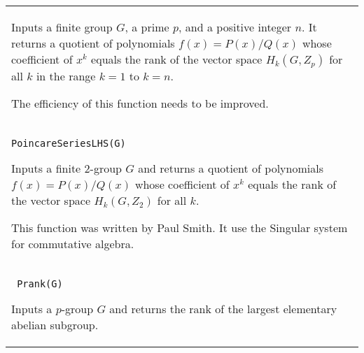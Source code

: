 \documentclass[a4paper,11pt]{report}
\begin{document}
{\begin{center}
\begin{tabular}{|l|}
 Inputs a finite group $G$, a prime $p$, and a positive integer $n$. It returns a quotient of polynomials $f(x)=P(x)/Q(x)$ whose coefficient of $x^k$ equals the rank of the vector space $H_k(G,Z_p)$ for all $k$ in the range $k=1$ to $k=n$. 

 The efficiency of this function needs to be improved. \\
 \texttt{PoincareSeriesLHS(G) } 

 Inputs a finite $2$-group $G$ and returns a quotient of polynomials $f(x)=P(x)/Q(x)$ whose coefficient of $x^k$ equals the rank of the vector space $H_k(G,Z_2)$ for all $k$. 

 This function was written by Paul Smith. It use the Singular system for
commutative algebra. \\
 \index{Prank} \texttt{ Prank(G) } 

 Inputs a $p$-group $G$ and returns the rank of the largest elementary abelian subgroup. \\
\end{tabular}\\[2mm]
\end{center}

 }

 
\end{document}
